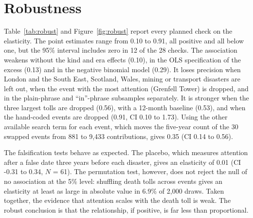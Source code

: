 \documentclass[11pt,a4paper]{article}
\begin{document}
\section{Robustness}
\label{sec:robust}
Table~\ref{tab:robust} and Figure~\ref{fig:robust} report every planned check on the elasticity. The point estimates range from 0.10 to 0.91, all positive and all below one, but the 95\% interval includes zero in 12 of the 28 checks. The association weakens without the kind and era effects (0.10), in the OLS specification of the excess (0.13) and in the negative binomial model (0.29). It loses precision when London and the South East, Scotland, Wales, mining or transport disasters are left out, when the event with the most attention (Grenfell Tower) is dropped, and in the plain-phrase and ``in''-phrase subsamples separately. It is stronger when the three largest tolls are dropped (0.56), with a 12-month baseline (0.53), and when the hand-coded events are dropped (0.91, CI 0.10 to 1.73). Using the other available search term for each event, which moves the five-year count of the 30 swapped events from 881 to 9,433 contributions, gives 0.35 (CI 0.14 to 0.56).

The falsification tests behave as expected. The placebo, which measures attention after a false date three years before each disaster, gives an elasticity of 0.01 (CI -0.31 to 0.34, $N$ = 61). The permutation test, however, does not reject the null of no association at the 5\% level: shuffling death tolls across events gives an elasticity at least as large in absolute value in 6.9\% of 2,000 draws. Taken together, the evidence that attention scales with the death toll is weak. The robust conclusion is that the relationship, if positive, is far less than proportional.
\end{document}
